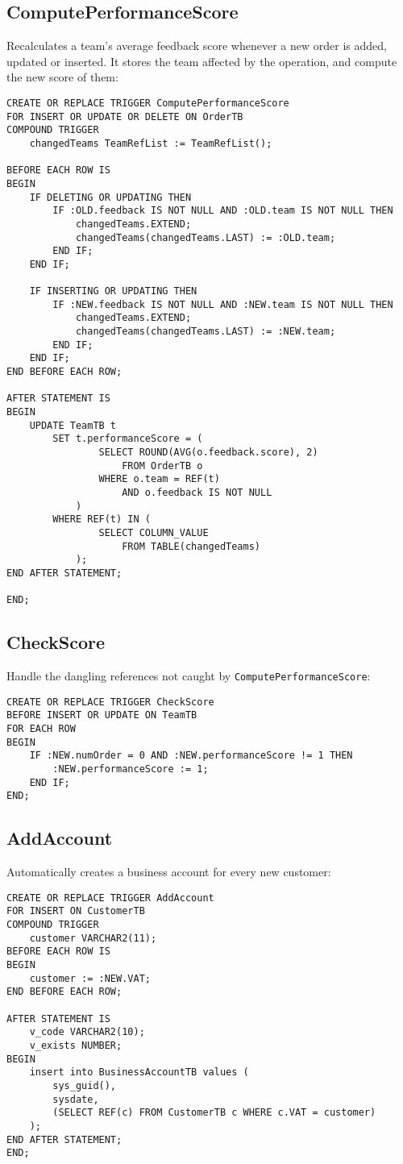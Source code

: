 \subsection*{ComputePerformanceScore}
Recalculates a team's average feedback score whenever a new order is added, updated or inserted. It stores the team affected by the operation, and compute the new score of them:
\begin{lstlisting}
CREATE OR REPLACE TRIGGER ComputePerformanceScore
FOR INSERT OR UPDATE OR DELETE ON OrderTB
COMPOUND TRIGGER
    changedTeams TeamRefList := TeamRefList();

BEFORE EACH ROW IS
BEGIN
    IF DELETING OR UPDATING THEN
        IF :OLD.feedback IS NOT NULL AND :OLD.team IS NOT NULL THEN
            changedTeams.EXTEND;
            changedTeams(changedTeams.LAST) := :OLD.team;
        END IF;
    END IF;

    IF INSERTING OR UPDATING THEN
        IF :NEW.feedback IS NOT NULL AND :NEW.team IS NOT NULL THEN
            changedTeams.EXTEND;
            changedTeams(changedTeams.LAST) := :NEW.team;
        END IF;
    END IF;
END BEFORE EACH ROW;

AFTER STATEMENT IS
BEGIN
    UPDATE TeamTB t
        SET t.performanceScore = (
                SELECT ROUND(AVG(o.feedback.score), 2)
                    FROM OrderTB o
                WHERE o.team = REF(t)
                    AND o.feedback IS NOT NULL
            )
        WHERE REF(t) IN (
                SELECT COLUMN_VALUE
                    FROM TABLE(changedTeams)
            );
END AFTER STATEMENT;

END;
\end{lstlisting}

\subsection*{CheckScore}
Handle the dangling references not caught by \texttt{ComputePerformanceScore}:
\begin{lstlisting}
CREATE OR REPLACE TRIGGER CheckScore
BEFORE INSERT OR UPDATE ON TeamTB
FOR EACH ROW
BEGIN
    IF :NEW.numOrder = 0 AND :NEW.performanceScore != 1 THEN
        :NEW.performanceScore := 1;
    END IF;
END;
\end{lstlisting}

\subsection*{AddAccount}
Automatically creates a business account for every new customer:
\begin{lstlisting}
CREATE OR REPLACE TRIGGER AddAccount
FOR INSERT ON CustomerTB
COMPOUND TRIGGER
    customer VARCHAR2(11);
BEFORE EACH ROW IS
BEGIN
    customer := :NEW.VAT;
END BEFORE EACH ROW;

AFTER STATEMENT IS
    v_code VARCHAR2(10);
    v_exists NUMBER;
BEGIN
    insert into BusinessAccountTB values (
        sys_guid(),
        sysdate, 
        (SELECT REF(c) FROM CustomerTB c WHERE c.VAT = customer)
    );
END AFTER STATEMENT;
END;
\end{lstlisting}


